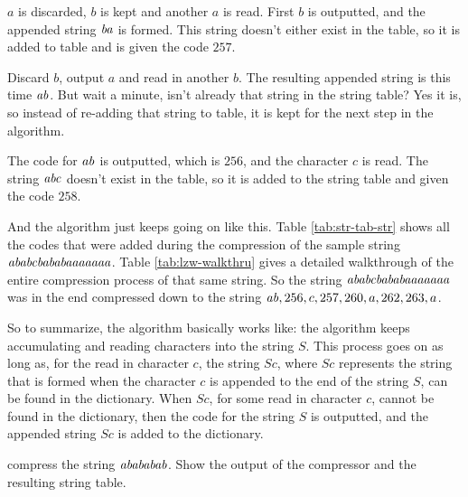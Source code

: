$a$ is discarded, $b$ is kept and another $a$ is
read. First $b$ is outputted, and the appended string
$\mathit{ba}$ is formed. This string doesn't either exist in the table,
 so it is added to table and is given the code $257$.

 Discard $b$, output $a$ and read in another $b$. The
 resulting appended string is this time $\mathit{ab}$. But wait a minute,
 isn't already that string in the string table? Yes it is, so instead
 of re-adding that string to table, it is kept for the next step in
 the algorithm.

The code for $\mathit{ab}$ is outputted, which is $256$, and the character $c$ is
read. The string $\mathit{abc}$ doesn't exist in the table, so it is
added to the string table and given the code $258$.

And the algorithm just keeps going on like this. Table
\ref{tab:str-tab-str} shows all the codes that were added during the
compression of the sample string $\mathit{ababcbababaaaaaaa}$. Table
\ref{tab:lzw-walkthru} gives a detailed walkthrough of the entire
compression process of that same string. So the string
$\mathit{ababcbababaaaaaaa}$ was in the end compressed down to the
string $\mathit{ab},256,c,257,260,a,262,263,a$.

So to summarize, the \lzw algorithm basically works like: the algorithm
keeps accumulating and reading characters into the string $S$. This
process goes on as long as, for the read in character $c$, the string
$Sc$, where $Sc$ represents the string that is formed when the
character $c$ is appended to the end of the string $S$, can be found
in the dictionary. When $Sc$, for some read in character $c$, cannot
be found in the dictionary, then the code for the string $S$ is
outputted, and the appended string $Sc$ is added to the dictionary.

\begin{Exercise}[label={lzw-compress}]

  \lzw compress the string $\mathit{abababab}$. Show the output of the
  compressor and the resulting string table.

\end{Exercise}


